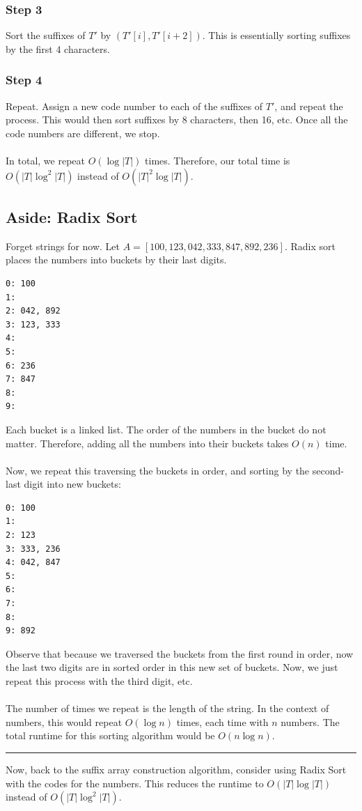 \documentclass[10pt]{article}
\begin{document}
\subsubsection*{Step 3}
Sort the suffixes of $T'$ by $(T'[i], T'[i + 2])$.  This is essentially sorting suffixes by the first 4 characters.

\subsubsection*{Step 4}
Repeat.  Assign a new code number to each of the suffixes of $T'$, and repeat the process.  This would then sort suffixes by 8 characters, then 16, etc.  Once all the code numbers are different, we stop. \\\\
In total, we repeat $O(\log |T|)$ times.  Therefore, our total time is $O(|T| \log^2 |T|)$ instead of $O(|T|^2 \log |T|)$.

\subsection*{Aside: Radix Sort}
Forget strings for now.  Let $A = [100, 123, 042, 333, 847, 892, 236]$.  Radix sort places the numbers into buckets by their last digits.
\begin{verbatim}
0: 100 
1: 
2: 042, 892
3: 123, 333
4: 
5: 
6: 236
7: 847
8: 
9: 
\end{verbatim}
Each bucket is a linked list.  The order of the numbers in the bucket do not matter.  Therefore, adding all the numbers into their buckets takes $O(n)$ time.\\\\
Now, we repeat this traversing the buckets in order, and sorting by the second-last digit into new buckets:
\begin{verbatim}
0: 100 
1: 
2: 123
3: 333, 236
4: 042, 847 
5: 
6:
7:
8: 
9: 892
\end{verbatim}
Observe that because we traversed the buckets from the first round in order, now the last two digits are in sorted order in this new set of buckets.  Now, we just repeat this process with the third digit, etc. \\\\
The number of times we repeat is the length of the string.  In the context of numbers, this would repeat $O(\log n)$ times, each time with $n$ numbers.  The total runtime for this sorting algorithm would be $O(n \log n)$.

\rule{\textwidth}{2pt}
Now, back to the suffix array construction algorithm, consider using Radix Sort with the codes for the numbers.  This reduces the runtime to $O(|T| \log |T|)$ instead of $O(|T| \log^2 |T|)$.
\end{document}
